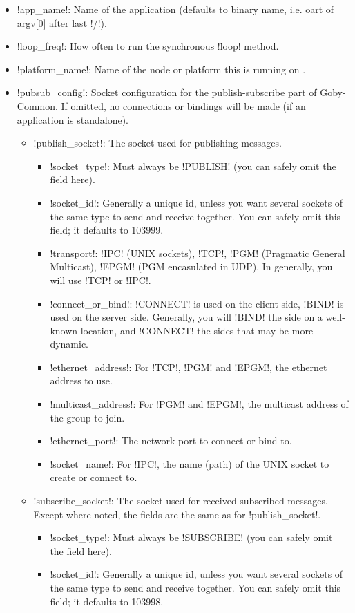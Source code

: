 \begin{itemize}
\item !app_name!: Name of the application (defaults to binary name, i.e. oart of argv[0] after last !/!).
\item !loop_freq!: How often to run the synchronous !loop! method. 
\item !platform_name!: Name of the node or platform this is running on .
\item !pubsub_config!: Socket configuration for the publish-subscribe part of Goby-Common. If omitted, no connections or bindings will be made (if an application is standalone).
\begin{itemize}
\item !publish_socket!: The socket used for publishing messages. 
\begin{itemize}
\item !socket_type!: Must always be !PUBLISH! (you can safely omit the field here).
\item !socket_id!: Generally a unique id, unless you want several sockets of the same type to send and receive together. You can safely omit this field; it defaults to 103999.
\item !transport!: !IPC! (UNIX sockets), !TCP!, !PGM! (Pragmatic General Multicast), !EPGM! (PGM encasulated in UDP). In generally, you will use !TCP! or !IPC!.
\item !connect_or_bind!: !CONNECT! is used on the client side, !BIND! is used on the server side. Generally, you will !BIND! the side on a well-known location, and !CONNECT! the sides that may be more dynamic.
\item !ethernet_address!: For !TCP!, !PGM! and !EPGM!, the ethernet address to use.
\item !multicast_address!: For !PGM! and !EPGM!, the multicast address of the group to join.
\item !ethernet_port!: The network port to connect or bind to.
\item !socket_name!: For !IPC!, the name (path) of the UNIX socket to create or connect to.
\end{itemize}
\item !subscribe_socket!: The socket used for received subscribed messages. Except where noted, the fields are the same as for !publish_socket!. 
\begin{itemize}
\item !socket_type!: Must always be !SUBSCRIBE! (you can safely omit the field here).
\item !socket_id!: Generally a unique id, unless you want several sockets of the same type to send and receive together. You can safely omit this field; it defaults to 103998.

\end{itemize}
\end{itemize}
\end{itemize}
